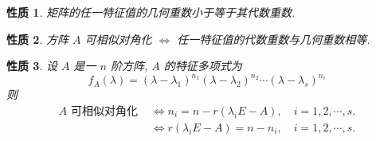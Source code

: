 \documentclass[13pt]{beamer}
\newtheorem*{prop}{性质}
\begin{document}
\begin{frame}
\begin{prop}
矩阵的任一特征值的几何重数小于等于其代数重数.
\end{prop}

\begin{prop}
方阵 $A$ 可相似对角化 $\Leftrightarrow$ 任一特征值的代数重数与几何重数相等.
\end{prop}

\begin{prop}
设 $A$ 是一 $n$ 阶方阵, $A$ 的特征多项式为 $$f_{A}(\lambda)=\left(\lambda-\lambda_{1}\right)^{n_{1}}\left(\lambda-\lambda_{2}\right)^{n_{2}} \cdots\left(\lambda-\lambda_{s}\right)^{n_{i}}$$
则 
\begin{align*}
A \mbox{ 可相似对角化 } & \Leftrightarrow n_{i}=n-r\left(\lambda_{i} E-A\right), \quad  i=1,2, \cdots, s.\\
& \Leftrightarrow r\left(\lambda_{i} E-A\right)=n-n_{i}, \quad i=1,2, \cdots, s.
\end{align*}
\end{prop}
\end{frame}
\end{document}
